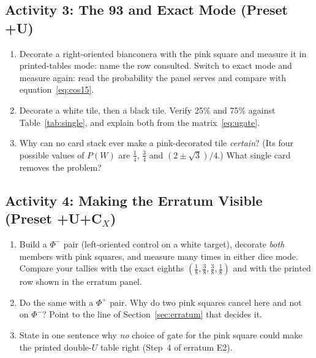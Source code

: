 \documentclass[a4paper,11pt]{article}
\begin{document}
\subsection{Activity 3: The 93 and Exact Mode (Preset +U)}

\begin{studentbox}
\begin{enumerate}
    \item Decorate a right-oriented bianconera with the pink square and measure it in
          printed-tables mode: name the row consulted. Switch to exact mode and measure
          again: read the probability the panel serves and compare with
          equation~\eqref{eq:cos15}.
    \item Decorate a white tile, then a black tile. Verify 25\% and 75\% against
          Table~\ref{tab:single}, and explain both from the matrix~\eqref{eq:ugate}.
    \item Why can no card stack ever make a pink-decorated tile \emph{certain}? (Its
          four possible values of $P(W)$ are $\tfrac14$, $\tfrac34$ and
          $(2 \pm \sqrt 3)/4$.) What single card removes the problem?
\end{enumerate}
\end{studentbox}

\subsection{Activity 4: Making the Erratum Visible (Preset \texorpdfstring{+U+C$_X$}{+U+CX})}

\begin{studentbox}
\begin{enumerate}
    \item Build a $\Phi^-$ pair (left-oriented control on a white target), decorate
          \emph{both} members with pink squares, and measure many times in either dice
          mode. Compare your tallies with the exact eighths
          $(\tfrac18, \tfrac38, \tfrac38, \tfrac18)$ and with the printed row shown in
          the erratum panel.
    \item Do the same with a $\Phi^+$ pair. Why do two pink squares cancel here and not
          on $\Phi^-$? Point to the line of Section~\ref{sec:erratum} that decides it.
    \item State in one sentence why \emph{no} choice of gate for the pink square could
          make the printed double-$U$ table right (Step~4 of erratum E2).
\end{enumerate}
\end{studentbox}
\end{document}
